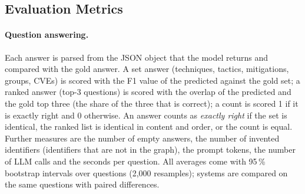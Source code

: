 \documentclass[12pt, a4paper]{article}
\begin{document}
\subsection{Evaluation Metrics}
\paragraph{Question answering.} Each answer is parsed from the JSON object that the model returns and compared with the gold answer. A set answer (techniques, tactics, mitigations, groups, CVEs) is scored with the F1 value of the predicted against the gold set; a ranked answer (top-3 questions) is scored with the overlap of the predicted and the gold top three (the share of the three that is correct); a count is scored 1 if it is exactly right and 0 otherwise. An answer counts as \emph{exactly right} if the set is identical, the ranked list is identical in content and order, or the count is equal. Further measures are the number of empty answers, the number of invented identifiers (identifiers that are not in the graph), the prompt tokens, the number of LLM calls and the seconds per question. All averages come with 95\,\% bootstrap intervals over questions (2,000 resamples); systems are compared on the same questions with paired differences.
\end{document}
